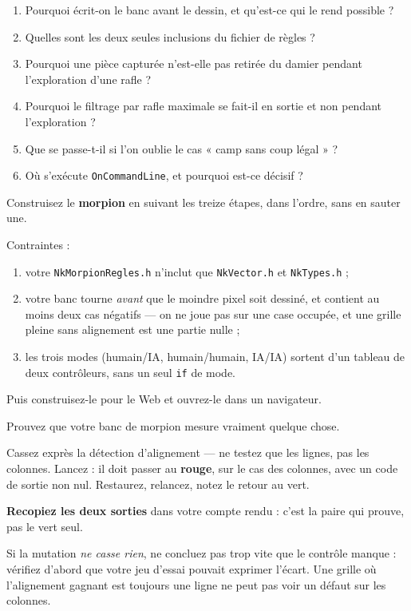 \begin{nkquestions}
\begin{enumerate}
\item Pourquoi écrit-on le banc avant le dessin, et qu'est-ce qui le rend
      possible ?
\item Quelles sont les deux seules inclusions du fichier de règles ?
\item Pourquoi une pièce capturée n'est-elle pas retirée du damier pendant
      l'exploration d'une rafle ?
\item Pourquoi le filtrage par rafle maximale se fait-il en sortie et non
      pendant l'exploration ?
\item Que se passe-t-il si l'on oublie le cas « camp sans coup légal » ?
\item Où s'exécute \texttt{OnCommandLine}, et pourquoi est-ce décisif ?
\end{enumerate}
\end{nkquestions}

\begin{nkpratique}
Construisez le \textbf{morpion} en suivant les treize étapes, dans l'ordre, sans
en sauter une.

Contraintes :
\begin{enumerate}
\item votre \texttt{NkMorpionRegles.h} n'inclut que \texttt{NkVector.h} et
      \texttt{NkTypes.h} ;
\item votre banc tourne \emph{avant} que le moindre pixel soit dessiné, et
      contient au moins deux cas négatifs --- on ne joue pas sur une case
      occupée, et une grille pleine sans alignement est une partie nulle ;
\item les trois modes (humain/IA, humain/humain, IA/IA) sortent d'un tableau de
      deux contrôleurs, sans un seul \texttt{if} de mode.
\end{enumerate}

Puis construisez-le pour le Web et ouvrez-le dans un navigateur.
\end{nkpratique}

\begin{nkdemo}
Prouvez que votre banc de morpion mesure vraiment quelque chose.

Cassez exprès la détection d'alignement --- ne testez que les lignes, pas les
colonnes. Lancez : il doit passer au \textbf{rouge}, sur le cas des colonnes,
avec un code de sortie non nul. Restaurez, relancez, notez le retour au vert.

\textbf{Recopiez les deux sorties} dans votre compte rendu : c'est la paire qui
prouve, pas le vert seul.

\alerte{} Si la mutation \emph{ne casse rien}, ne concluez pas trop vite que le contrôle
manque : vérifiez d'abord que votre jeu d'essai pouvait exprimer l'écart. Une
grille où l'alignement gagnant est toujours une ligne ne peut pas voir un défaut
sur les colonnes.
\end{nkdemo}

